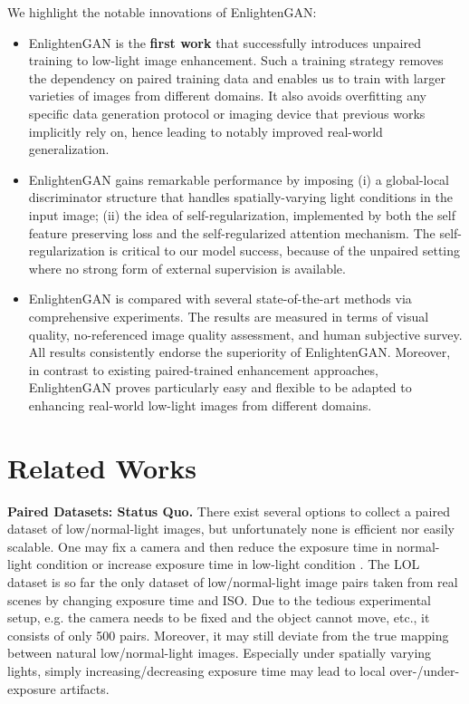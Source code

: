 \documentclass[journal]{IEEEtran}
\begin{document}
We highlight the notable innovations of EnlightenGAN: 

\begin{itemize}
 \vspace{0.5em}
  \item EnlightenGAN is the \textbf{first work} that successfully introduces unpaired training to low-light image enhancement. Such a training strategy removes the dependency on paired training data and enables us to train with larger varieties of images from different domains. It also avoids overfitting any specific data generation protocol or imaging device that previous works \cite{kalantari2017deep,wei2018deep,chen2018learning} implicitly rely on, 
hence leading to notably improved real-world generalization.
  \vspace{0.5em}
  \item EnlightenGAN gains remarkable performance by imposing (i) a global-local discriminator structure that handles spatially-varying light conditions in the input image; (ii) the idea of self-regularization, implemented by both the self feature preserving loss and the self-regularized attention mechanism. The self-regularization is critical to our model success, because of the unpaired setting where no strong form of external supervision is available. 
 \vspace{0.5em}
   \item EnlightenGAN is compared with several state-of-the-art methods via comprehensive experiments. The results are measured in terms of visual quality, no-referenced image quality assessment, and human subjective survey. 
All results consistently endorse the superiority of EnlightenGAN. Moreover, in contrast to existing paired-trained enhancement approaches, EnlightenGAN proves particularly easy and flexible to be adapted to enhancing real-world low-light images from different domains.
\end{itemize}







\section{Related Works}

\noindent \textbf{Paired Datasets: Status Quo.} There exist several options to collect a paired dataset of low/normal-light images, but unfortunately none is efficient nor easily scalable. One may fix a camera and then reduce the exposure time in normal-light condition \cite{wei2018deep} or increase exposure time in low-light condition \cite{chen2018learning}. The LOL dataset \cite{wei2018deep}
is so far the only dataset of low/normal-light image pairs taken from real scenes by changing exposure time and ISO. Due to the tedious experimental setup, e.g. the camera needs to be fixed and the object cannot move, etc., it consists of only 500 pairs. Moreover, it may still deviate from the true mapping between natural low/normal-light images. Especially under spatially varying lights, simply increasing/decreasing exposure time may lead to local over-/under-exposure artifacts. 
\end{document}
